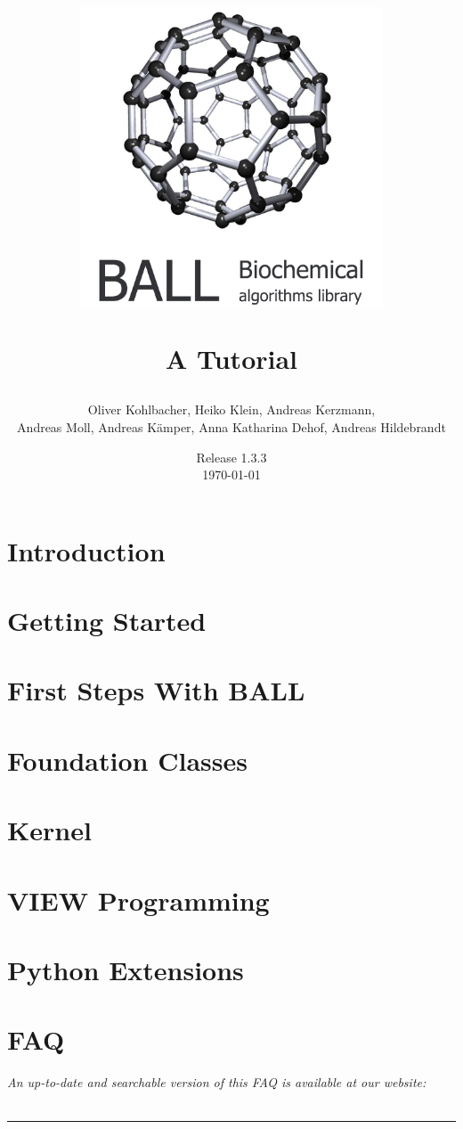 \documentclass[12pt,twoside]{report}
\author{
  Oliver Kohlbacher, Heiko Klein, Andreas Kerzmann, \\
  Andreas Moll, Andreas K\"{a}mper, Anna Katharina Dehof, Andreas Hildebrandt
}
\title{
  \begin{center}
    \includegraphics[width=9cm]{logo}
  \end{center}
  \vspace{1cm}
  \Large A Tutorial
}
\date{
  Release 1.3.3\\
  \today
}
\begin{document}
\setlength{\headheight}{14.5pt}
\setcounter{page}{1}
\maketitle
\cleardoublepage

\tableofcontents
\clearpage

\setcounter{page}{1}


\chapter{Introduction}
\label{chapter:introduction}



\chapter{Getting Started}
\label{chapter:getting-started}




\chapter{First Steps With BALL}
\label{chapter:first-steps}




\chapter{Foundation Classes}
\label{chapter:foundation-classes}




\chapter{Kernel}
\label{chapter:kernel}


\chapter{VIEW Programming}
\label{chapter:view-programming}


\chapter{Python Extensions}
\label{chapter:python}


\chapter{FAQ}
\label{chapter:faq}
\newpage
\noindent
{\it An up-to-date and searchable version of this FAQ is available at our 
website:\\
}\\
\hspace{1mm}
\rule{\textwidth}{0.1pt}
\hspace{3mm}

\end{document}
